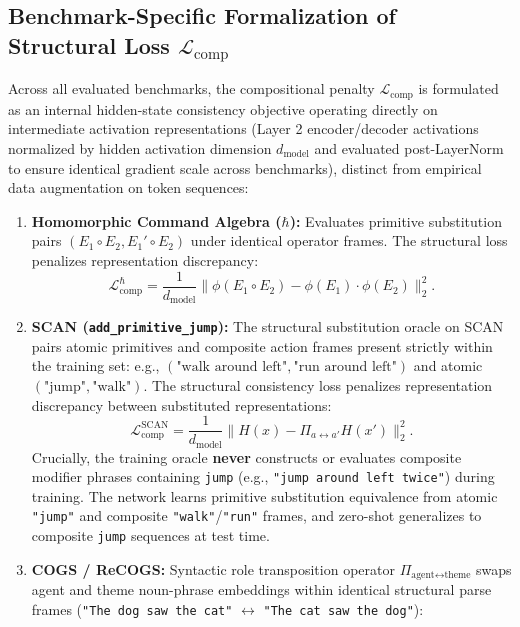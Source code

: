 \documentclass{article}
\theoremstyle{plain}
\theoremstyle{definition}
\begin{document}
\subsection{Benchmark-Specific Formalization of Structural Loss \texorpdfstring{$\mathcal{L}_{\text{comp}}$}{L-comp}}
\label{sec:appendix_comp_loss_implementation}
Across all evaluated benchmarks, the compositional penalty $\mathcal{L}_{\text{comp}}$ is formulated as an internal hidden-state consistency objective operating directly on intermediate activation representations (Layer 2 encoder/decoder activations normalized by hidden activation dimension $d_{\text{model}}$ and evaluated post-LayerNorm to ensure identical gradient scale across benchmarks), distinct from empirical data augmentation on token sequences:
\begin{enumerate}[leftmargin=*,noitemsep]
    \item \textbf{Homomorphic Command Algebra ($\hbar$):} Evaluates primitive substitution pairs $(E_1 \circ E_2, E_1' \circ E_2)$ under identical operator frames. The structural loss penalizes representation discrepancy:
    \begin{equation}
        \mathcal{L}_{\text{comp}}^{\hbar} = \frac{1}{d_{\text{model}}} \| \phi(E_1 \circ E_2) - \phi(E_1) \cdot \phi(E_2) \|_2^2.
    \end{equation}
    \item \textbf{SCAN (\texttt{add\_primitive\_jump}):} The structural substitution oracle on SCAN pairs atomic primitives and composite action frames present strictly within the training set: e.g., $(\text{"walk around left"}, \text{"run around left"})$ and atomic $(\text{"jump"}, \text{"walk"})$. The structural consistency loss penalizes representation discrepancy between substituted representations:
    \begin{equation}
        \mathcal{L}_{\text{comp}}^{\text{SCAN}} = \frac{1}{d_{\text{model}}} \| H(x) - \Pi_{a \leftrightarrow a'} H(x') \|_2^2.
    \end{equation}
    Crucially, the training oracle \textbf{never} constructs or evaluates composite modifier phrases containing \texttt{jump} (e.g., \texttt{"jump around left twice"}) during training. The network learns primitive substitution equivalence from atomic \texttt{"jump"} and composite \texttt{"walk"}/\texttt{"run"} frames, and zero-shot generalizes to composite \texttt{jump} sequences at test time.
    \item \textbf{COGS / ReCOGS:} Syntactic role transposition operator $\Pi_{\text{agent}\leftrightarrow\text{theme}}$ swaps agent and theme noun-phrase embeddings within identical structural parse frames (\texttt{"The dog saw the cat"} $\leftrightarrow$ \texttt{"The cat saw the dog"}):

\end{enumerate}
\end{document}
